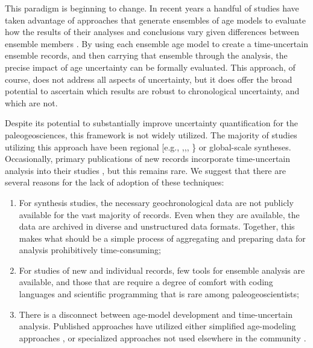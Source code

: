 \documentclass[gc, manuscript]{copernicus}
\begin{document}
This paradigm is beginning to change.
In recent years a handful of studies have taken advantage of approaches that generate ensembles of age models to evaluate how the results of their analyses and conclusions vary given differences between ensemble members \citep[\citet{Rhines_JGR2011},\citet{Anchukaitis_Tierney2012},\citet{Shakun_Nature2012},\citet{Marcott_Science2013}, \citet{Tierney2013}]{Haam_Huybers2010}.
By using each ensemble age model to create a time-uncertain ensemble records, and then carrying that ensemble through the analysis, the precise impact of age uncertainty can be formally evaluated.
This approach, of course, does not address all aspects of uncertainty, but it does offer the broad potential to ascertain which results are robust to chronological uncertainty, and which are not.

Despite its potential to substantially improve uncertainty quantification for the paleogeosciences, this framework is not widely utilized.
The majority of studies utilizing this approach have been regional {[}e.g., \citet{Anchukaitis_Tierney2012},\citet{Tierney2013},\citet{mckay_onset_2018}, \citet{routson2018}\} or global-scale \citep[e.g.,][\citet{Marcott_Science2013},\citet{kaufman2020HoloceneGMST}]{Shakun_Nature2012} syntheses.
Occasionally, primary publications of new records incorporate time-uncertain analysis into their studies \citep[more]{Boldt2015}, but this remains rare.
We suggest that there are several reasons for the lack of adoption of these techniques:

\begin{enumerate}
\def\labelenumi{\arabic{enumi}.}
\item
  For synthesis studies, the necessary geochronological data are not publicly available for the vast majority of records. Even when they are available, the data are archived in diverse and unstructured data formats. Together, this makes what should be a simple process of aggregating and preparing data for analysis prohibitively time-consuming;
\item
  For studies of new and individual records, few tools for ensemble analysis are available, and those that are require a degree of comfort with coding languages and scientific programming that is rare among paleogeoscientists;
\item
  There is a disconnect between age-model development and time-uncertain analysis. Published approaches have utilized either simplified age-modeling approaches \citep{Haam_Huybers2010}, or specialized approaches not used elsewhere in the community \citep[\citet{Anchukaitis_Tierney2012},\citet{Marcott_Science2013},\citet{Tierney2013},\citet{routson2018}]{Shakun_Nature2012}.
\end{enumerate}
\end{document}
